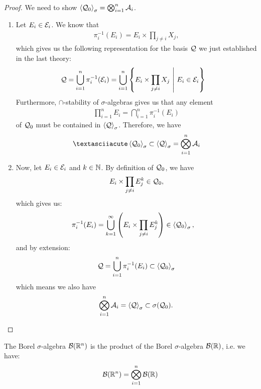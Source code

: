 \begin{proof}
	We need to show $\left\langle \mathcal{Q}_0 \right\rangle_\sigma = \bigotimes_{i = 1}^n \mathcal{A}_i$.
	\begin{enumerate}
		\item 			
		Let $E_i \in \mathcal{E}_i$. We know that
		\begin{align*}
			\pi_i^{-1}(E_i) = E_i \times \prod_{j \neq i} X_j,
		\end{align*}
		which gives us the following representation for the basis $\mathcal{Q}$ we just established in the last theory:
		\begin{align*}
			\mathcal{Q} = \bigcup_{i = 1}^n \pi_i^{-1}(\mathcal{E}_i)
			&=
			\bigcup_{i = 1}^n \qty{E_i \times \prod_{j \neq i} X_j ~\middle|~E_i \in \mathcal{E}_i}
		\end{align*}
		Furthermore, $\cap$-stability of $\sigma$-algebras gives us that any element
		\begin{align*}
			\prod_{i = 1}^n E_i =
			\bigcap_{i = 1}^n \pi_i^{-1}(E_i)
		\end{align*}
		of $\mathcal{Q}_0$
		must be contained in $\left\langle \mathcal{Q} \right\rangle_\sigma$.
		\newpar
		Therefore, we have
		\begin{align*}
			´\angles{\cQ_0}_\sigma \subset \angles{\cQ}_\sigma = \Tensor_{i = 1}^n \cA_i
		\end{align*}
		\item Now, let $E_i \in \mathcal{E}_i$ and $k \in \mathbb{N}$. By definition of $\mathcal{Q}_0$, we have
		\begin{align*}
			E_i \times \prod_{j \neq i} E_j^k \in \mathcal{Q}_0,
		\end{align*}
		which gives us:
		\begin{align*}
			\pi_i^{-1}(E_i)
			&= \bigcup_{k = 1}^\infty \qty(E_i \times \prod_{j \neq i} E_j^k)
			\in \left\langle \mathcal{Q}_0 \right\rangle_\sigma,
		\end{align*}
		and by extension:
		\begin{align*}
			\mathcal{Q} = \bigcup_{i = 1}^n \pi_i^{-1}(E_i)
			\subset \left\langle \mathcal{Q}_0 \right\rangle_\sigma
		\end{align*}
		which means we also have
		\begin{align*}
			\bigotimes_{i = 1}^n \mathcal{A}_i
			= \left\langle \mathcal{Q} \right\rangle_\sigma
			\subset \sigma(\mathcal{Q}_0).
		\end{align*}
	\end{enumerate}
\end{proof}
\begin{corollary}
	The Borel $\sigma$-algebra $\mathcal{B}(\mathbb{R}^n)$ is the product of the Borel $\sigma$-algebra $\mathcal{B}(\mathbb{R})$, i.e. we have:
	\begin{align*}
		\mathcal{B}(\mathbb{R}^n) = \bigotimes_{i = 1}^n \mathcal{B}(\mathbb{R})
	\end{align*}
\end{corollary}

